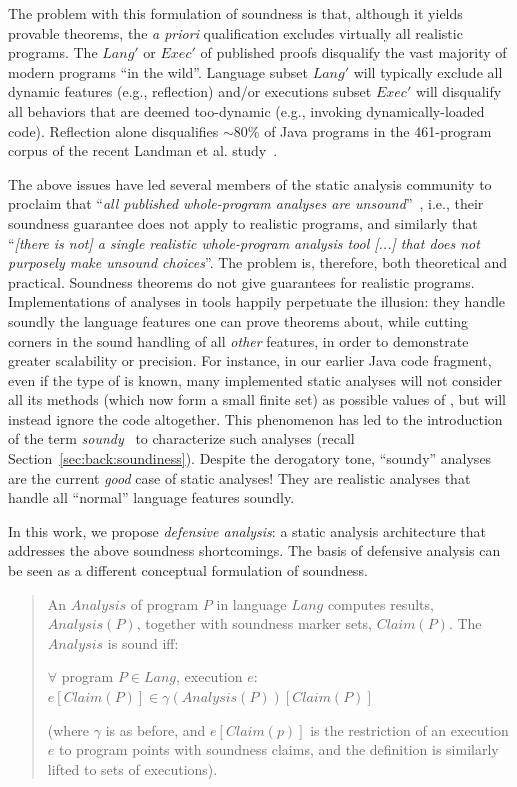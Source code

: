 The problem with this formulation of soundness is that, although it yields provable theorems, the \emph{a priori} qualification excludes virtually all realistic programs. The $Lang'$ or $Exec'$ of published proofs disqualify the vast majority of modern programs ``in the wild''. Language subset $Lang'$ will typically exclude all dynamic features (e.g., reflection) and/or executions subset $Exec'$ will disqualify all behaviors that are deemed too-dynamic (e.g., invoking dynamically-loaded code). Reflection alone disqualifies $\sim$80\% of Java programs in the 461-program corpus of the recent Landman et al. study~\cite{icse:2017:Landman}.

The above issues have led several members of the static analysis community to proclaim that ``\emph{all published whole-program analyses are unsound}''~\cite{article:2015:Livshits}, i.e., their soundness guarantee does not apply to realistic programs, and similarly that ``\emph{[there is not] a single realistic whole-program analysis tool [...] that does not purposely make unsound choices}''. The problem is, therefore, both theoretical and practical. Soundness theorems do not give guarantees for realistic programs. Implementations of analyses in tools happily perpetuate the illusion: they handle soundly the language features one can prove theorems about, while cutting corners in the sound handling of all \emph{other} features, in order to demonstrate greater scalability or precision. For instance, in our earlier Java code fragment, even if the type of  is known, many implemented static analyses will not consider all its methods (which now form a small finite set) as possible values of , but will instead ignore the code altogether. This phenomenon has led to the introduction of the term \emph{soundy}~\cite{article:2015:Livshits} to characterize such analyses (recall Section~\ref{sec:back:soundiness}). Despite the derogatory tone, ``soundy'' analyses are the current \emph{good} case of static analyses! They are realistic analyses that handle all ``normal'' language features soundly.

In this work, we propose \emph{defensive analysis}: a static analysis architecture that addresses the above soundness shortcomings. The basis of defensive analysis can be seen as a different conceptual formulation of soundness.

\begin{quote}
An $Analysis$ of program $P$ in language $Lang$ computes results, $Analysis(P)$, together with soundness marker sets, $Claim(P)$. The $Analysis$ is sound iff:

\hspace{8 mm} $\forall$ program $P \in Lang$, execution $e$: $e[Claim(P)] \in \gamma(Analysis(P))[Claim(P)]$

(where $\gamma$ is as before, and $e[Claim(p)]$ is the restriction of an execution $e$ to program points with soundness claims, and the definition is similarly lifted to sets of executions).
\end{quote}

